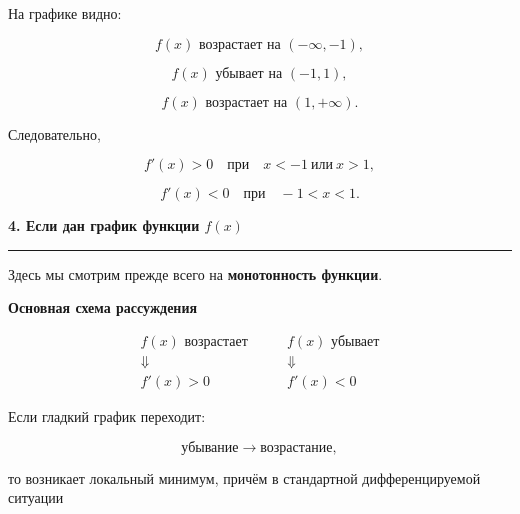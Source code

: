 \documentclass[a4paper,12pt]{article}
\newcommand{\maintitle}[1]{%
    {\Large\bfseries\color{darkaccent}#1\par}
    \vspace{2mm}
    {\color{accent}\rule{\linewidth}{0.6pt}}
    \vspace{4mm}
}
\newcommand{\subhead}[1]{%
    \vspace{3mm}
    {\large\bfseries\color{darkaccent}#1\par}
    \vspace{1mm}
}
\begin{document}
На графике видно:

\[
f(x)\text{ возрастает на }(-\infty,-1),
\]

\[
f(x)\text{ убывает на }(-1,1),
\]

\[
f(x)\text{ возрастает на }(1,+\infty).
\]

Следовательно,

\[
f'(x)>0
\quad\text{при}\quad
x<-1\ \text{или}\ x>1,
\]

\[
f'(x)<0
\quad\text{при}\quad
-1<x<1.
\]

\begin{center}
\end{center}

\maintitle{4. Если дан график функции \(f(x)\)}

Здесь мы смотрим прежде всего на \textbf{монотонность функции}.

\subhead{Основная схема рассуждения}

\[
\boxed{
\begin{array}{c}
f(x)\text{ возрастает}\\[1mm]
\Downarrow\\[1mm]
f'(x)>0
\end{array}}
\qquad
\boxed{
\begin{array}{c}
f(x)\text{ убывает}\\[1mm]
\Downarrow\\[1mm]
f'(x)<0
\end{array}}
\]

Если гладкий график переходит:

\[
\text{убывание}\longrightarrow\text{возрастание},
\]

то возникает локальный минимум, причём в стандартной дифференцируемой
ситуации
\end{document}
